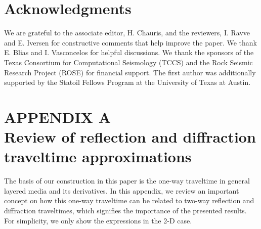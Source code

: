 \section{Acknowledgments}
We are grateful to the associate editor, H. Chauris, and the reviewers, I. Ravve and E. Iversen for constructive comments that help improve the paper. We thank E. Blias and I. Vasconcelos for helpful discussions. We thank the sponsors of the Texas Consortium for Computational Seismology (TCCS) and the Rock Seismic Research Project (ROSE) for financial support. The first author was additionally supported by the Statoil Fellows Program at the University of Texas at Austin.

\clearpage
\section{APPENDIX A \\ Review of reflection and diffraction traveltime approximations}
\label{sec:appa}
The basis of our construction in this paper is the one-way traveltime in general layered media and its derivatives. In this appendix, we review an important concept on how this one-way traveltime can be related to two-way reflection and diffraction traveltimes, which signifies the importance of the presented results. For simplicity, we only show the expressions in the 2-D case.

